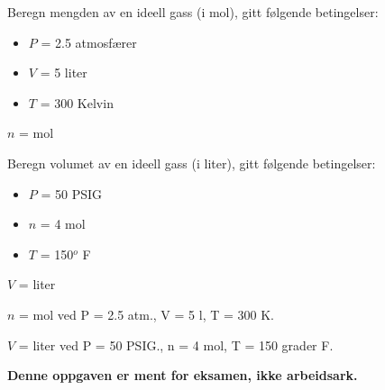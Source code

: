 

Beregn mengden av en ideell gass (i mol), gitt følgende betingelser:

\begin{itemize}
\item{} $P$ = 2.5 atmosfærer
\item{} $V$ = 5 liter
\item{} $T$ = 300 Kelvin
\end{itemize}

$n$ = \underbar{\hskip 50pt} mol

\vskip 100pt

Beregn volumet av en ideell gass (i liter), gitt følgende betingelser:

\begin{itemize}
\item{} $P$ = 50 PSIG
\item{} $n$ = 4 mol
\item{} $T$ = 150$^{o}$ F
\end{itemize}

$V$ = \underbar{\hskip 50pt} liter








$n$ =  mol ved P = 2.5 atm., V = 5 l, T = 300 K.

\vskip 10pt

$V$ =  liter ved P = 50 PSIG., n = 4 mol, T = 150 grader F.







{\bf Denne oppgaven er ment for eksamen, ikke arbeidsark.}

